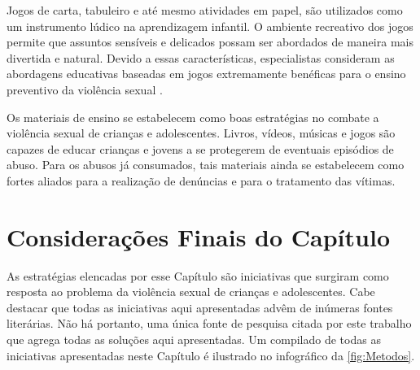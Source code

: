 Jogos de carta, tabuleiro e até mesmo atividades em papel, são utilizados como um instrumento lúdico na aprendizagem infantil. O ambiente recreativo dos jogos permite que assuntos sensíveis e delicados possam ser abordados de maneira mais divertida e natural. Devido a essas características, especialistas consideram as abordagens educativas baseadas em jogos extremamente benéficas para o ensino preventivo da violência sexual \cite{meyer2017analise}.


Os materiais de ensino se estabelecem como boas estratégias no combate a violência sexual de crianças e adolescentes. Livros, vídeos, músicas e jogos são capazes de educar crianças e jovens a se protegerem de eventuais episódios de abuso. Para os abusos já consumados, tais materiais ainda se estabelecem como fortes aliados para a realização de denúncias e para o tratamento das vítimas. 


\section{Considerações Finais do Capítulo}\label{sec:finais}

As estratégias elencadas por esse Capítulo são iniciativas que surgiram como resposta ao problema da violência sexual de crianças e adolescentes. Cabe destacar que todas as iniciativas aqui apresentadas advêm de inúmeras fontes literárias. Não há portanto, uma única fonte de pesquisa citada por este trabalho que agrega todas as soluções aqui apresentadas. Um compilado de todas as iniciativas apresentadas neste Capítulo é ilustrado no infográfico da \autoref{fig:Metodos}.

\vspace{0.5cm}

